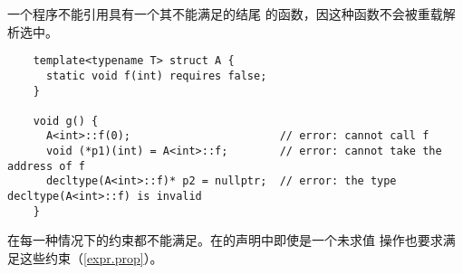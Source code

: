 \begin{note}
  一个程序不能引用具有一个其不能满足的结尾
  的函数，因这种函数不会被重载解析选中。

\begin{example}
  \begin{lstlisting}
    template<typename T> struct A {
      static void f(int) requires false;
    }

    void g() {
      A<int>::f(0);                       // error: cannot call f
      void (*p1)(int) = A<int>::f;        // error: cannot take the address of f
      decltype(A<int>::f)* p2 = nullptr;  // error: the type decltype(A<int>::f) is invalid
    }
  \end{lstlisting}
  在每一种情况下的约束都不能满足。在的声明中即使是一个未求值
  操作也要求满足这些约束（\ref{expr.prop}）。\end{example}

\end{note}
